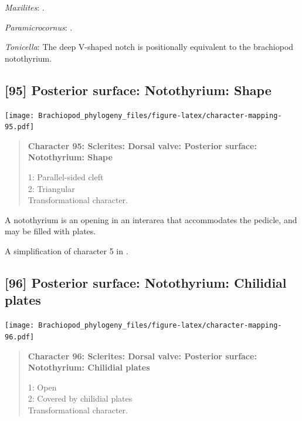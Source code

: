 \documentclass[openany]{book}
\begin{document}
\hypertarget{Maxilites-coding-94}{}
\emph{Maxilites}: \citet{Marek1972}.

\hypertarget{Paramicrocornus-coding-94}{}
\emph{Paramicrocornus}: \citet{Zhang2018Ahyolithid}.

\hypertarget{Tonicella-coding-94}{}
\emph{Tonicella}: The deep V-shaped notch \citep[fig. 8]{Schwabe2010} is
positionally equivalent to the brachiopod notothyrium.

\subsection*{{[}95{]} Posterior surface: Notothyrium:
Shape}\label{posterior-surface-notothyrium-shape}

\texttt{[image: Brachiopod\_phylogeny\_files/figure-latex/character-mapping-95.pdf]}

\begin{quote}
\textbf{Character 95: Sclerites: Dorsal valve: Posterior surface:
Notothyrium: Shape}

1: Parallel-sided cleft\\
2: Triangular\\
Transformational character.
\end{quote}

A notothyrium is an opening in an interarea that accommodates the
pedicle, and may be filled with plates.

A simplification of character 5 in
\citet{Bassett2001Functionalmorphology}.

\subsection*{{[}96{]} Posterior surface: Notothyrium: Chilidial
plates}\label{posterior-surface-notothyrium-chilidial-plates}

\texttt{[image: Brachiopod\_phylogeny\_files/figure-latex/character-mapping-96.pdf]}

\begin{quote}
\textbf{Character 96: Sclerites: Dorsal valve: Posterior surface:
Notothyrium: Chilidial plates}

1: Open\\
2: Covered by chilidial plates\\
Transformational character.
\end{quote}
\end{document}
